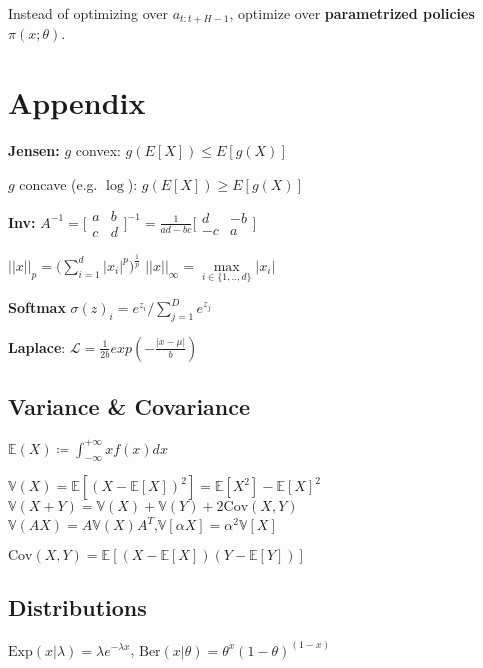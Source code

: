 \documentclass[11pt,landscape,a4paper,fleqn]{article}
\begin{document}
\begin{multicols*}{4}
Instead of optimizing over \(a_{t:t + H - 1}\), optimize over \textbf{parametrized policies} \(\pi(x; \theta)\).

\section{Appendix}

\textbf{Jensen: }$g$ convex: $g(E[X]) \leq E[g(X)]$

$g$ concave (e.g. $\log$): $g(E[X]) \geq E[g(X)]$


\textbf{Inv:} $A^{-1}=
\big[
\begin{smallmatrix}
a&b \\ 
c&d
\end{smallmatrix}\big]^{-1}=
\frac{1}{ad-bc}
\big[
\begin{smallmatrix}
d&-b \\ 
-c&a
\end{smallmatrix}\big]
$

$||x||_p = \big( \sum_{i=1}^d |x_i|^p \big)^{\frac{1}{p}}$ \quad $||x||_\infty = \max\limits_{i \in \{1,..,d\}} |x_i|$

\vspace*{-3mm}
\textbf{Softmax} $\sigma(z)_i = e^{z_i} / \sum_{j=1}^{D} e^{z_j}$

\textbf{Laplace}: $\mathcal{L} = \frac{1}{2b}exp(-\frac{|x-\mu|}{b})$

\subsection*{Variance \& Covariance}
\(\mathbb{E}(X) \coloneqq \int_{ - \infty}^{ + \infty} xf(x) dx\)

$\mathbb{V}(X){=}\mathbb{E}[(X{-}\mathbb{E}[X])^2]{=}\mathbb{E}[X^2]{-}\mathbb{E}[X]^2$\\
$\mathbb{V}(X + Y) = \mathbb{V}(X) + \mathbb{V}(Y) + 2\mathrm{Cov}(X,Y)$\\
$\mathbb{V}(AX) = A \mathbb{V}(X) A^T$,$\mathbb{V}[\alpha X]=\alpha^2\mathbb{V}[X]$

$\mathrm{Cov}(X,Y)=\mathbb{E}[(X-\mathbb{E}[X])(Y-\mathbb{E}[Y])]$

\subsection*{Distributions}
$\mathrm{Exp}(x|\lambda){=}\lambda e^{-\lambda x}$, $\mathrm{Ber}(x|\theta){=}\theta^x (1{-}\theta)^{(1-x)}$


\end{multicols*}
\end{document}
